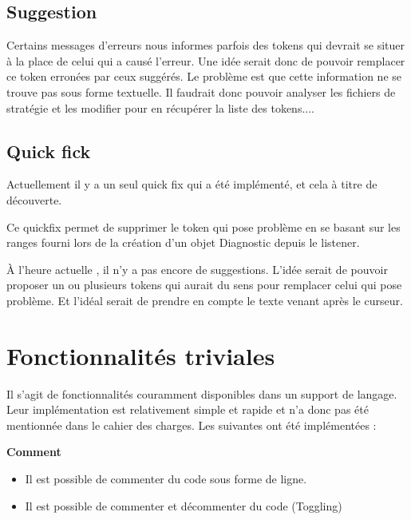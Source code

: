 \documentclass[
    iict, %
    il, %
]{heig-tb}
\begin{document}
\subsection{Suggestion}
Certains messages d'erreurs nous informes parfois des tokens qui devrait se situer à la place de celui qui a causé l'erreur.
Une idée serait donc de pouvoir remplacer ce token erronées par ceux suggérés.
Le problème est que cette information ne se trouve pas sous forme textuelle.
Il faudrait donc pouvoir analyser les fichiers de stratégie et les modifier pour en récupérer la liste des tokens....


\subsection{Quick fick}


Actuellement il y a un seul quick fix qui a été implémenté, et cela à titre de découverte.

Ce quickfix permet de supprimer le token qui pose problème en se basant sur les ranges fourni lors de la création d'un objet Diagnostic depuis le listener.

À l'heure actuelle , il n'y a pas encore de suggestions. L'idée serait de pouvoir proposer un ou plusieurs tokens qui aurait du sens pour remplacer celui qui pose problème.
Et l'idéal serait de prendre en compte le texte venant après le curseur. %

\section{Fonctionnalités triviales}
Il s'agit de fonctionnalités couramment disponibles dans un support de langage. Leur implémentation est relativement simple et rapide et n'a donc pas été mentionnée dans le cahier des charges.
Les suivantes ont été implémentées :


\textbf{Comment}
\begin{itemize}
    \item Il est possible de commenter du code sous forme de ligne.
    \item Il est possible de commenter et décommenter du code (Toggling)
\end{itemize}
\end{document}
